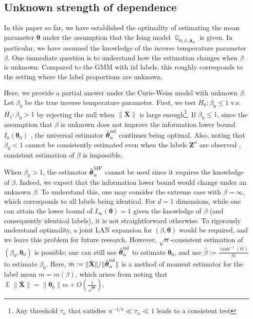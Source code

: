 \documentclass[preprint,reqno]{imsart}
\newcommand{\ttheta}{\boldsymbol{\theta}}
\DeclareMathOperator{\EE}{\mathbb{E}}
\DeclareMathOperator{\QQ}{\mathbb{Q}}
\newcommand{\A}{\mathbf{A}}
\newcommand{\Z}{\mathbf{Z}}
\newcommand{\X}{\mathbf{X}}
\newcommand{\thetaiid}{\hat{\boldsymbol \theta}^{\text{iid}}_{\mathnormal n}}
\newcommand{\thetamf}{\hat{\boldsymbol \theta}^{\text{MF}}_{\mathnormal n}}
\begin{document}
\subsection{Unknown strength of dependence}
In this paper so far, we have established the optimality of estimating the mean parameter $\ttheta$ under the assumption that the Ising model $\QQ_{0, \beta, \A_n}$ is given. In particular, we have assumed the knowledge of the inverse temperature parameter $\beta$.
One immediate question is to understand how the estimation changes when $\beta$ is unknown. Compared to the GMM with iid labels, this roughly corresponds to the setting where the label proportions are unknown.

Here, we provide a partial answer under the Curie-Weiss model with unknown $\beta$. Let $\beta_0$ be the true inverse temperature parameter. First, we test $H_0: \beta_0 \le 1$ v.s. $H_1: \beta_0 > 1$ by rejecting the null when $\lVert\bar{\X}\rVert$ is large enough\footnote{Any threshold $\tau_n$ that satisfies $n^{-1/4} \ll \tau_n \ll 1$ leads to a consistent test}. If $\beta_0 \le 1$, since the assumption that $\beta$ is unknown does not improve the information lower bound $I_0(\ttheta_0)$ \citep[e.g. pg 128 in][]{lehmann2006theory}, the universal estimator $\thetaiid$ continues being optimal. Also, noting that $\beta_0 < 1$ cannot be consistently estimated even when the labels $\Z^n$ are observed \citep{bhattacharya2018inference}, consistent estimation of $\beta$ is impossible. 

When $\beta_0 > 1$, the estimator $\thetamf$ cannot be used since it requires the knowledge of $\beta$. 
%
{
Indeed, we expect that the information lower bound would change under an unknown $\beta$. To understand this, one may consider the extreme case with $\beta = \infty$, which corresponds to all labels being identical. For $d=1$ dimensions, while one can attain the lower bound of $I_{\infty}(\ttheta) = 1$ given the knowledge of $\beta$ (and consequently identical labels), it is not straightforward otherwise. To rigorously understand optimality, a joint LAN expansion for $(\beta,\ttheta)$ would be required, and we leave this problem for future research.
%
}
However, $\sqrt{n}$-consistent estimation of $(\beta_0, \ttheta_0)$ is possible; one can still use $\thetaiid$ to estimate $\ttheta_0$, and use $\hat{\beta} := \frac{\tanh^{-1}(\hat{m})}{\hat{m}}$ to estimate $\beta_0$. Here, $\hat{m} := {\lVert \bar{\X} \rVert}/{\lVert \thetaiid \rVert}$ is a method of moment estimator for the label mean $m = m(\beta)$, which arises from noting that $\EE\lVert \bar{\X}\rVert = \lVert \ttheta_0 \rVert m + O\left( \frac{1}{\sqrt{n}}\right)$.
%
\end{document}
